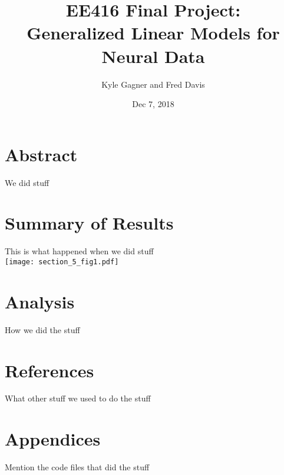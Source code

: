 \documentclass[letterpaper,titlepage,10pt]{article}
\title{EE416 Final Project:\\Generalized Linear Models for Neural Data}
\date{Dec 7, 2018}
\author{Kyle Gagner and Fred Davis}
\begin{document}
\maketitle
\section{Abstract}
We did stuff
\section{Summary of Results}
This is what happened when we did stuff\\
\texttt{[image: section\_5\_fig1.pdf]}
\section{Analysis}
How we did the stuff
\section{References}
What other stuff we used to do the stuff
\section{Appendices}
Mention the code files that did the stuff
\end{document}
